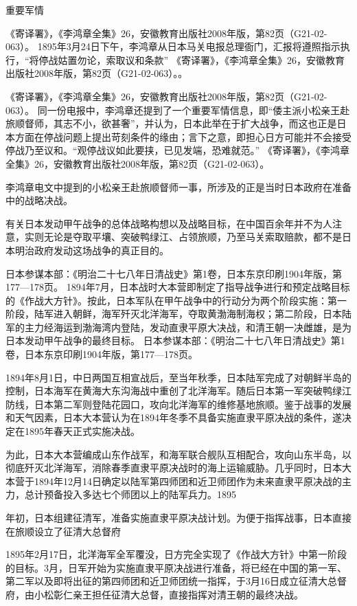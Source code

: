 \documentclass[12pt,UTF8]{ctexbook}
\begin{document}
重要军情

《寄译署》，《李鸿章全集》26，安徽教育出版社2008年版，第82页（G21-02-063）。
1895年3月24日下午，李鸿章从日本马关电报总理衙门，汇报将遵照指示执行，“将停战姑置勿论，索取议和条款” 《寄译署》，《李鸿章全集》26，安徽教育出版社2008年版，第82页（G21-02-063）。。

《寄译署》，《李鸿章全集》26，安徽教育出版社2008年版，第82页（G21-02-063）。
同一份电报中，李鸿章还提到了一个重要军情信息，即“倭主派小松亲王赴旅顺督师，其志不小，欲甚奢”，并认为，日本此举在于扩大战争，而这也正是日本方面在停战问题上提出苛刻条件的缘由；言下之意，即担心日方可能并不会接受停战乃至议和。“观停战议如此要挟，已见发端，恐难就范。” 《寄译署》，《李鸿章全集》26，安徽教育出版社2008年版，第82页（G21-02-063）。

李鸿章电文中提到的小松亲王赴旅顺督师一事，所涉及的正是当时日本政府在准备中的战略决战。

有关日本发动甲午战争的总体战略构想以及战略目标，在中国百余年并不为人注意，实则无论是夺取平壤、突破鸭绿江、占领旅顺，乃至马关索取赔款，都不是日本明治政府发动这场战争的真正目的。

日本参谋本部：《明治二十七八年日清战史》第1卷，日本东京印刷1904年版，第177—178页。
1894年7月，日本战时大本营即制定了指导战争进行和预定战略目标的《作战大方针》。按此，日本军队在甲午战争中的行动分为两个阶段实施：第一阶段，陆军进入朝鲜，海军歼灭北洋海军，夺取黄渤海制海权；第二阶段，日本陆军的主力经海运到渤海湾内登陆，发动直隶平原大决战，和清王朝一决雌雄，是为日本发动甲午战争的最终目标。 日本参谋本部：《明治二十七八年日清战史》第1卷，日本东京印刷1904年版，第177—178页。

1894年8月1日，中日两国互相宣战后，至当年秋季，日本陆军完成了对朝鲜半岛的控制，日本海军在黄海大东沟海战中重创了北洋海军。随后日本第一军突破鸭绿江防线，日本第二军则登陆花园口，攻向北洋海军的维修基地旅顺。鉴于战事的发展和天气因素，日本大本营认为在1894年冬季不具备实施直隶平原决战的条件，遂决定在1895年春天正式实施决战。

为此，日本大本营编成山东作战军，和海军联合舰队互相配合，攻向山东半岛，以彻底歼灭北洋海军，消除春季直隶平原决战时的海上运输威胁。几乎同时，日本大本营于1894年12月14日确定以陆军第四师团和近卫师团作为未来直隶平原决战的主力，总计预备投入多达七个师团以上的陆军兵力。1895


年初，日本组建征清军，准备实施直隶平原决战计划。为便于指挥战事，日本直接在旅顺设立了征清大总督府

1895年2月17日，北洋海军全军覆没，日方完全实现了《作战大方针》中第一阶段的目标。3月，日军开始为实施直隶平原决战进行准备，将已经在中国的第一军、第二军以及即将出征的第四师团和近卫师团统一指挥，于3月16日成立征清大总督府，由小松彰仁亲王担任征清大总督，直接指挥对清王朝的最终决战。
\end{document}

